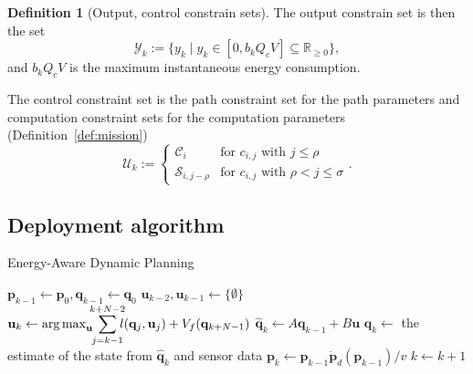 \documentclass[letterpaper,10pt,conference]{ieeeconf}
\theoremstyle{definition}
\newtheorem{defn}{Definition}[section]
\DeclareMathOperator*{\argmax}{arg\,max}
\begin{document}
\begin{defn}[Output, control constrain sets]\label{def:const}
The output constrain set is then the set
\begin{equation*}
  \mathcal{Y}_k:=\{y_k\mid y_k\in[0,b_kQ_cV]\subseteq{\mathbb{R}_{\geq 0}}\},
\end{equation*}
and $b_kQ_cV$ is the maximum instantaneous energy consumption.

The control constraint set is the path constraint set for the path parameters and computation constraint sets for the computation parameters (Definition~\ref{def:mission})
\begin{equation*}
  \mathcal{U}_k:=\begin{cases}
    \mathcal{C}_i & \text{for } c_{i,j} \text{ with } j\leq\rho\\
    \mathcal{S}_{i,j-\rho} & \text{for } c_{i,j} \text{ with } \rho<j\leq\sigma
  \end{cases}.
\end{equation*}
\end{defn}

\subsection{Deployment algorithm}

\begin{algorithm}[t]
  \caption{Energy-Aware Dynamic Planning}\label{alg}
  \begin{algorithmic}[1]
    \STATE $\mathbf{p}_{k-1}\gets \mathbf{p}_0, \mathbf{q}_{k-1}\gets \mathbf{q}_0$
    \STATE $\mathbf{u}_{k-2},\mathbf{u}_{k-1}\gets \{\emptyset\}$\label{alg:init}
    \label{alg:stages-loop}
        \STATE $\mathbf{u}_k\gets\argmax_{\mathbf{u}}\hspace*{-1ex}{\displaystyle{\sum\limits_{j=k-1}^{k+N-2}}\hspace*{-1ex}{l(\mathbf{q}_j,\mathbf{u}_j)+V_f(\mathbf{q}_{k+N-1})}}$\label{alg:mpc}
        \STATE $\hat{\mathbf{q}}_{k}\gets A\mathbf{q}_{k-1}+B\mathbf{u}$\label{alg:evolution}
        \STATE $\mathbf{q}_{k}\gets$ the estimate of the state from $\hat{\mathbf{q}}_{k}$ and sensor data\label{alg:kalman_end}
        \STATE $\mathbf{p}_{k}\gets\mathbf{p}_{k-1}\dot{\mathbf{p}}_d(\mathbf{p}_{k-1})/v$ \label{alg:pos}
        \STATE $k\gets k+1$
      \ENDWHILE
    \ENDFOR
  \end{algorithmic} 
\end{algorithm}
\end{document}
